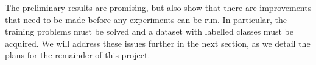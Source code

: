 The preliminary results are promising, but also show that there are improvements that need to be made before any experiments can be run.
In particular, the training problems must be solved and a dataset with labelled classes must be acquired.
We will address these issues further in the next section, as we detail the plans for the remainder of this project.
